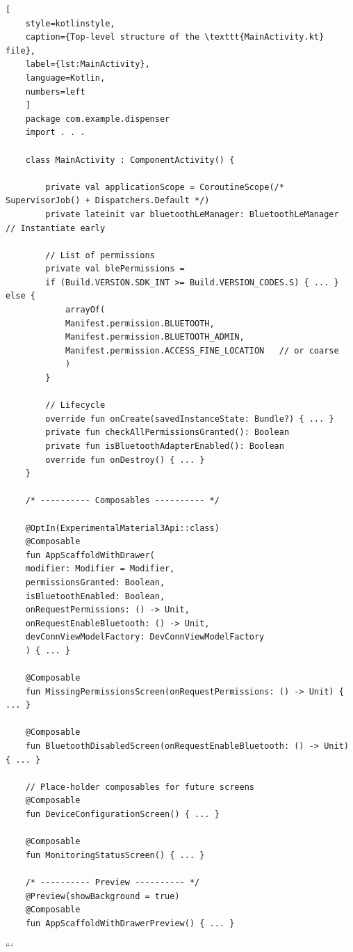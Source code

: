 \begin{lstlisting}[
	style=kotlinstyle,
	caption={Top-level structure of the \texttt{MainActivity.kt} file},
	label={lst:MainActivity},
	language=Kotlin,
	numbers=left
	]
	package com.example.dispenser
	import . . .
	
	class MainActivity : ComponentActivity() {
		
		private val applicationScope = CoroutineScope(/* SupervisorJob() + Dispatchers.Default */)
		private lateinit var bluetoothLeManager: BluetoothLeManager   // Instantiate early
		
		// List of permissions
		private val blePermissions =
		if (Build.VERSION.SDK_INT >= Build.VERSION_CODES.S) { ... } else {
			arrayOf(
			Manifest.permission.BLUETOOTH,
			Manifest.permission.BLUETOOTH_ADMIN,
			Manifest.permission.ACCESS_FINE_LOCATION   // or coarse
			)
		}
		
		// Lifecycle
		override fun onCreate(savedInstanceState: Bundle?) { ... }
		private fun checkAllPermissionsGranted(): Boolean
		private fun isBluetoothAdapterEnabled(): Boolean
		override fun onDestroy() { ... }
	}
	
	/* ---------- Composables ---------- */
	
	@OptIn(ExperimentalMaterial3Api::class)
	@Composable
	fun AppScaffoldWithDrawer(
	modifier: Modifier = Modifier,
	permissionsGranted: Boolean,
	isBluetoothEnabled: Boolean,
	onRequestPermissions: () -> Unit,
	onRequestEnableBluetooth: () -> Unit,
	devConnViewModelFactory: DevConnViewModelFactory
	) { ... }
	
	@Composable
	fun MissingPermissionsScreen(onRequestPermissions: () -> Unit) { ... }
	
	@Composable
	fun BluetoothDisabledScreen(onRequestEnableBluetooth: () -> Unit) { ... }
	
	// Place-holder composables for future screens
	@Composable
	fun DeviceConfigurationScreen() { ... }
	
	@Composable
	fun MonitoringStatusScreen() { ... }
	
	/* ---------- Preview ---------- */
	@Preview(showBackground = true)
	@Composable
	fun AppScaffoldWithDrawerPreview() { ... }
\end{lstlisting}
```

